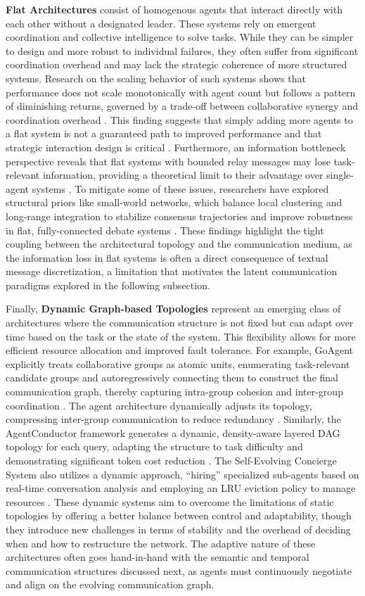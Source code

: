 \documentclass[11pt]{article}
\begin{document}
\textbf{Flat Architectures} consist of homogenous agents that interact directly with each other without a designated leader. These systems rely on emergent coordination and collective intelligence to solve tasks. While they can be simpler to design and more robust to individual failures, they often suffer from significant coordination overhead and may lack the strategic coherence of more structured systems. Research on the scaling behavior of such systems shows that performance does not scale monotonically with agent count but follows a pattern of diminishing returns, governed by a trade-off between collaborative synergy and coordination overhead \cite{ref28}. This finding suggests that simply adding more agents to a flat system is not a guaranteed path to improved performance and that strategic interaction design is critical \cite{ref28}. Furthermore, an information bottleneck perspective reveals that flat systems with bounded relay messages may lose task-relevant information, providing a theoretical limit to their advantage over single-agent systems \cite{ref58}. To mitigate some of these issues, researchers have explored structural priors like small-world networks, which balance local clustering and long-range integration to stabilize consensus trajectories and improve robustness in flat, fully-connected debate systems \cite{ref59}. These findings highlight the tight coupling between the architectural topology and the communication medium, as the information loss in flat systems is often a direct consequence of textual message discretization, a limitation that motivates the latent communication paradigms explored in the following subsection.

Finally, \textbf{Dynamic Graph-based Topologies} represent an emerging class of architectures where the communication structure is not fixed but can adapt over time based on the task or the state of the system. This flexibility allows for more efficient resource allocation and improved fault tolerance. For example, GoAgent explicitly treats collaborative groups as atomic units, enumerating task-relevant candidate groups and autoregressively connecting them to construct the final communication graph, thereby capturing intra-group cohesion and inter-group coordination \cite{ref60}. The agent architecture dynamically adjusts its topology, compressing inter-group communication to reduce redundancy \cite{ref60}. Similarly, the AgentConductor framework generates a dynamic, density-aware layered DAG topology for each query, adapting the structure to task difficulty and demonstrating significant token cost reduction \cite{ref47}. The Self-Evolving Concierge System also utilizes a dynamic approach, ``hiring'' specialized sub-agents based on real-time conversation analysis and employing an LRU eviction policy to manage resources \cite{ref61}. These dynamic systems aim to overcome the limitations of static topologies by offering a better balance between control and adaptability, though they introduce new challenges in terms of stability and the overhead of deciding when and how to restructure the network. The adaptive nature of these architectures often goes hand-in-hand with the semantic and temporal communication structures discussed next, as agents must continuously negotiate and align on the evolving communication graph.
\end{document}
